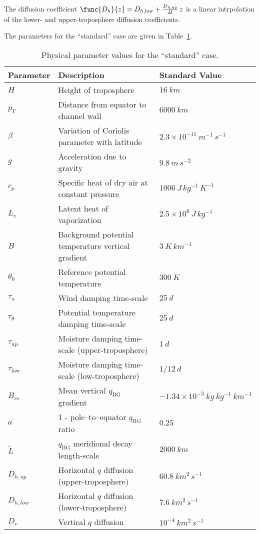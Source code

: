 The diffusion coefficient $\func{D_h}{z} = D_{h,\text{low}} + \frac{D_{h,\text{up}}}{H}\,z$ is a linear intrpolation of the lower- and upper-troposphere diffusion coefficients.

The parameters for the ``standard'' case are given in Table~\ref{tbl:std_params}.

\begin{table}[H]
	\centering
	\begin{tabular*}{\textwidth}{l @{\extracolsep{\fill}}l @{\extracolsep{\fill}}l}
		\hline
		Parameter & Description & Standard Value \\ \hline
		$H$ & Height of troposphere & $16\ km$ \\
		$p_Y$ & Distance from equator to channel wall & $6000\ km$ \\
		$\beta$ & Variation of Coriolis parameter with latitude & $2.3 \times 10^{-11}\ m^{-1}\,s^{-1}$ \\
		$g$ & Acceleration due to gravity & $9.8\ m\,s^{-2}$ \\
		$c_p$ & Specific heat of dry air at constant pressure & $1006\ J\,kg^{-1}\,K^{-1}$ \\
		$L_v$ & Latent heat of vaporization & $2.5 \times 10^{6}\ J\,kg^{-1}$ \\
		$B$ & Background potential temperature vertical gradient & $3\ K\,km^{-1}$ \\
		$\theta_0$ & Reference potential temperature & $300\ K$ \\
		$\tau_u$ & Wind damping time-scale & $25\ d$ \\
		$\tau_{\theta}$ & Potential temperature damping time-scale & $25\ d$ \\
		$\tau_{\text{up}}$ & Moisture damping time-scale (upper-troposphere) & $1\ d$ \\
		$\tau_{\text{low}}$ & Moisture damping time-scale (low-troposphere) & $1/12\ d$ \\
		$B_{vs}$ & Mean vertical $q_{\text{BG}}$ gradient & $-1.34 \times 10^{-3}\ kg\ kg^{-1}\ km^{-1}$ \\
		$a$ & 1 - pole--to--equator $q_{\text{BG}}$ ratio & $0.25$ \\
		$\widetilde{L}$ & $q_{\text{BG}}$ meridional decay length-scale & $2000\ km$ \\
		$D_{h,up}$ & Horizontal $q$ diffusion (upper-troposphere) & $60.8\ km^2\,s^{-1}$ \\
		$D_{h,low}$ & Horizontal $q$ diffusion (lower-troposphere) & $7.6\ km^2\,s^{-1}$ \\
		$D_v$ & Vertical $q$ diffusion & $10^{-4}\ km^2\,s^{-1}$ \\ \hline
	\end{tabular*}
	\caption{Physical parameter values for the ``standard'' case.} 
	\label{tbl:std_params}
\end{table}